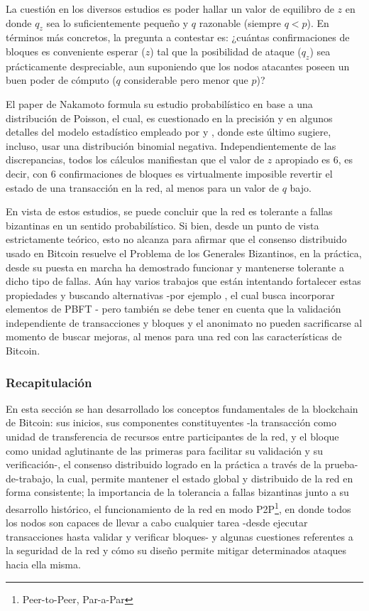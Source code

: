 La cuestión en los diversos estudios es poder hallar un valor de equilibro de $z$ en donde $q_z$ sea lo suficientemente pequeño y $q$ razonable (siempre $q < p$). En términos más concretos, la pregunta a contestar es: ¿cuántas confirmaciones de bloques es conveniente esperar ($z$) tal que la posibilidad de ataque ($q_z$) sea prácticamente despreciable, aun suponiendo que los nodos atacantes poseen un buen poder de cómputo ($q$ considerable pero menor que $p$)?

El paper de Nakamoto formula su estudio probabilístico en base a una distribución de Poisson, el cual, es cuestionado en la precisión y en algunos detalles del modelo estadístico empleado por \cite{DBLP:journals/corr/OzisikL17} y \cite{DBLP:journals/corr/Rosenfeld14}, donde este último sugiere, incluso, usar una distribución binomial negativa. Independientemente de las discrepancias, todos los cálculos manifiestan que el valor de $z$ apropiado es 6, es decir, con 6 confirmaciones de bloques es virtualmente imposible revertir el estado de una transacción en la red, al menos para un valor de $q$ bajo.

En vista de estos estudios, se puede concluir que la red es tolerante a fallas bizantinas en un sentido probabilístico. Si bien, desde un punto de vista estrictamente teórico, esto no alcanza para afirmar que el consenso distribuido usado en Bitcoin resuelve el Problema de los Generales Bizantinos, en la práctica, desde su puesta en marcha ha demostrado funcionar y mantenerse tolerante a dicho tipo de fallas. Aún hay varios trabajos que están intentando fortalecer estas propiedades y buscando alternativas -por ejemplo \cite{kogias2016enhancing}, el cual busca incorporar elementos de PBFT \cite{Castro:1999:PBF:296806.296824}- pero también se debe tener en cuenta que la validación independiente de transacciones y bloques y el anonimato no pueden sacrificarse al momento de buscar mejoras, al menos para una red con las características de Bitcoin.

\subsubsection{Recapitulación}

En esta sección se han desarrollado los conceptos fundamentales de la blockchain de Bitcoin: sus inicios, sus componentes constituyentes -la transacción como unidad de transferencia de recursos entre participantes de la red, y el bloque como unidad aglutinante de las primeras para facilitar su validación y su verificación-, el consenso distribuido logrado en la práctica a través de la prueba-de-trabajo, la cual, permite mantener el estado global y distribuido de la red en forma consistente; la importancia de la tolerancia a fallas bizantinas junto a su desarrollo histórico, el funcionamiento de la red en modo P2P\footnote{Peer-to-Peer, Par-a-Par}, en donde todos los nodos son capaces de llevar a cabo cualquier tarea -desde ejecutar transacciones hasta validar y verificar bloques- y algunas cuestiones referentes a la seguridad de la red y cómo su diseño permite mitigar determinados ataques hacia ella misma.

